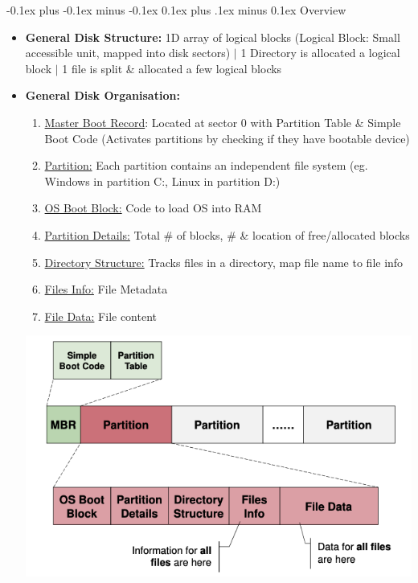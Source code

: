 \documentclass[landscape]{article}
\makeatletter
\renewcommand{\subsection}{\@startsection{subsection}{2}{0mm}%
  {-0.1ex plus -0.1ex minus -0.1ex}%
  {0.1ex plus .1ex minus 0.1ex}%
{\normalfont\scriptsize\bfseries}}
\makeatother
\begin{document}
\begin{multicols*}{6}
    \subsection{Overview}
    \begin{itemize}
      \item \textbf{General Disk Structure:} 1D array of logical blocks (Logical Block: Small accessible unit, mapped into disk sectors) $\vert$ 1 Directory is allocated a logical block $\vert$ 1 file is split \& allocated a few logical blocks
      \item \textbf{General Disk Organisation:}
      \begin{enumerate}
        \item \underline{Master Boot Record}: Located at sector 0  with Partition Table \& Simple Boot Code (Activates partitions by checking if they have bootable device)
        \item \underline{Partition:} Each partition contains an independent file system (eg. Windows in partition C:, Linux in partition D:)
        \item \underline{OS Boot Block:} Code to load OS into RAM
        \item \underline{Partition Details:} Total \# of blocks, \# \& location of free/allocated blocks
        \item \underline{Directory Structure:} Tracks files in a directory, map file name to file info
        \item \underline{Files Info:} File Metadata
        \item \underline{File Data:} File content
      \end{enumerate}
      \includegraphics[width=1.0\linewidth]{21_disk_organisation.png}
    \end{itemize}


\end{multicols*}
\end{document}
